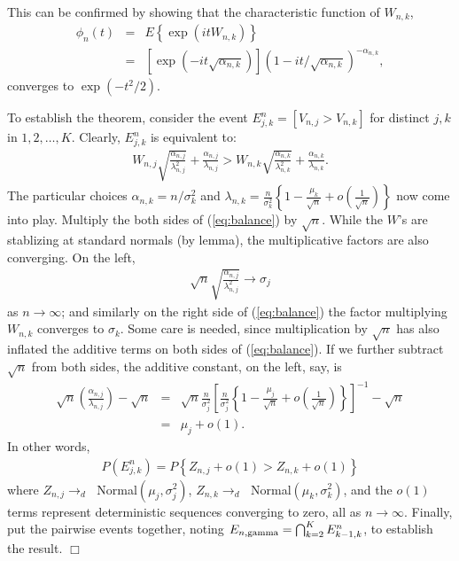 \noindent
This can be confirmed by showing that the characteristic function
of $W_{n,k}$,
\begin{eqnarray*}
\phi_n(t) &= & E\left\{ \exp( i t W_{n,k} ) \right\} \\
 &=& \left[ \exp\left( -i t \sqrt{\alpha_{n,k}} \right) \right] 
     \left(  1 - it/\sqrt{
   \alpha_{n,k} }  \right)^{ -\alpha_{n,k} },
\end{eqnarray*}
converges to $\exp( - t^2/2 ) $.

To establish the theorem, 
 consider the event $E^n_{j,k} = [ V_{n,j} > V_{n,k} ]$
for distinct $j, k$ in $1, 2, \ldots, K$.  Clearly, $E^n_{j,k}$ is
equivalent to:
\begin{eqnarray}
\label{eq:balance}
W_{n,j} \sqrt{ \frac{ \alpha_{n,j} }{ \lambda_{n,j}^2 } }
+ \frac{ \alpha_{n,j} }{ \lambda_{n,j} } 
>
W_{n,k} \sqrt{ \frac{ \alpha_{n,k} }{ \lambda_{n,k}^2 } }
+ \frac{ \alpha_{n,k} }{ \lambda_{n,k} } .
\end{eqnarray}
The particular choices $\alpha_{n,k} = n/\sigma_k^2$ and
 $\lambda_{n,k} = \frac{n}{\sigma_k^2} \left\{ 1 - \frac{\mu_k}{\sqrt{n}}
 + o\left( \frac{1}{\sqrt{n}} \right) \right\}$ now come into play.
Multiply the both sides of (\ref{eq:balance}) by $\sqrt{n}$.  
While the $W$'s are stablizing at standard normals (by lemma), 
the multiplicative
factors are also converging. On the left,
\begin{eqnarray*}
\sqrt{n} \sqrt{ \frac{ \alpha_{n,j} }{\lambda_{n,j}^2 } }
 \longrightarrow \sigma_j
\end{eqnarray*}
as $n \rightarrow \infty$;
and similarly on the right side of (\ref{eq:balance}) 
 the factor multiplying $W_{n,k}$ converges to $\sigma_k$.
Some care is needed, since multiplication by $\sqrt{n}$ has also
inflated the additive terms on both sides of (\ref{eq:balance}). If we
further subtract $\sqrt{n}$ from both sides, the additive constant, on
the left, say, is
\begin{eqnarray*}
\sqrt{n} \left( \frac{ \alpha_{n,j} }{\lambda_{n,j} } \right) - \sqrt{n}
 &=&  \sqrt{n} \frac{n}{\sigma_j^2} \left[ \frac{n}{\sigma_j^2} 
  \left\{ 1 - \frac{\mu_j}{\sqrt{n}} + o\left( \frac{1}{\sqrt{n}} \right) 
 \right\}
  \right]^{-1} - \sqrt{n} \\
 &=&   \mu_j + o(1). 
\end{eqnarray*}
In other words, 
\begin{eqnarray*}
P( E^n_{j,k} ) = P\left\{ Z_{n,j} + o(1) > Z_{n,k} + o(1) \right\}
\end{eqnarray*}
 where $Z_{n,j} \longrightarrow_{d} \; $
 Normal$(\mu_j, \sigma_j^2 )$,
 $Z_{n,k} \longrightarrow_{d} \; $ Normal$(\mu_k, \sigma_k^2)$, and the 
$o(1)$ terms
represent deterministic sequences converging to zero, all as 
 $n \rightarrow \infty$.  Finally, put the pairwise events 
together, noting $E_{n,{\rm gamma}} = \bigcap_{k=2}^K E^n_{k-1,k}$,
to establish the result. $\Box$

\nocite{ksch,press,rab}




